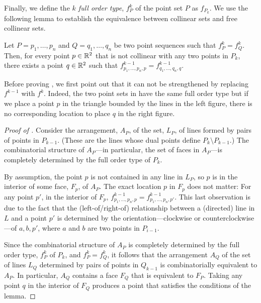 \documentclass{patmorin}
\begin{document}
Finally, we define the \emph{$k$ full order type}, $f^k_P$ of the
point set $P$ as $f_{P_k}$.  We use the following lemma to establish the
equivalence between collinear sets and free collinear sets.

\begin{lem}
   Let $P=p_1,\ldots,p_n$ and $Q=q_1,\ldots,q_n$ be two point
   sequences such that  $f^k_P=f^{k}_Q$.  Then, for every point
   $p\in \mathbb{R}^2$ that is not collinear with any two points in $P_k$,
   there exists a point $q\in\mathbb{R}^2$ such that $f^{k-1}_{p_1,\ldots,p_n,p} =
   f^{k-1}_{q_1,\ldots,q_n,q}$.
\end{lem}

Before proving , we first point out that it can not be
strengthened by replacing $f^{k-1}$ with $f^k$. Indeed, the two point
sets in  have the same full order type but if
we place a point $p$ in the triangle bounded by the lines in the left
figure, there is no corresponding location to place $q$ in the right 
figure.

\begin{proof}[Proof of ]
   Consider the arrangement, $A_P$, of the set, $L_P$, of lines formed
   by pairs of points in $P_{k-1}$. (These are the lines whose dual
   points define $P_k\setminus P_{k-1}$.)  The combinatorial structure
   of $A_P$---in particular, the set of faces in $A_P$---is completely
   determined by the full order type of $P_k$.

   By assumption, the point $p$ is not contained in any line in
   $L_P$, so $p$ is in the interior of some face, $F_p$, of $A_P$.
   The exact location $p$ in $F_p$ does not matter: For any point
   $p'$, in the interior of $F_p$, $f^{k-1}_{p_1,\ldots,p_n,p} =
   f^{k-1}_{p_1,\ldots,p_n,p'}$.  This last observation is due to the fact
   that the (left-of/right-of) relationship between a (directed) line in
   $L$ and   a point $p'$ is determined by the orientation---clockwise
   or counterclockwise---of $a,b,p'$, where $a$ and $b$ are two points
   in $P_{i-1}$.

   Since the combinatorial structure of $A_P$ is completely determined
   by the full order type, $f^{k}_P$ of $P_k$, and $f^k_{P}=f^k_Q$, it
   follows that the arrangement $A_Q$ of the set of lines $L_Q$ determined
   by pairs of points in $Q_{k-1}$ is combinatorially equivalent to $A_P$.
   In particular, $A_Q$ contains a face $F_Q$ that is equivalent to $F_P$.
   Taking any point $q$ in the interior of $F_Q$ produces a point that
   satisfies the conditions of the lemma.
\end{proof}
\end{document}
